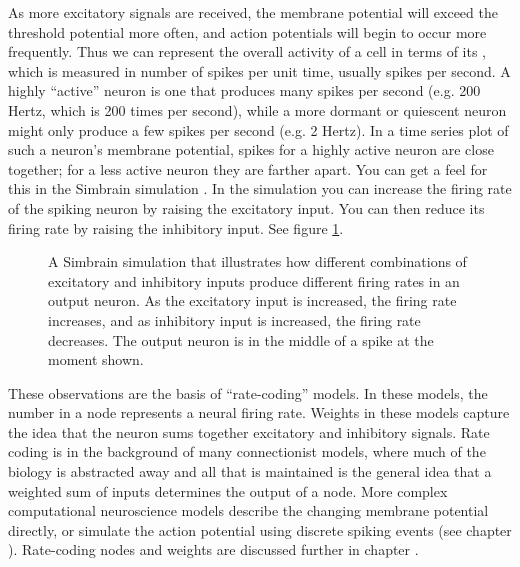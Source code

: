 As more excitatory signals are received, the membrane potential will exceed the threshold potential more often, and action potentials will begin to occur more frequently. Thus we can represent the overall activity of a cell in terms of its , which is measured in number of spikes per unit time, usually spikes per second. A highly ``active'' neuron is one that produces many spikes per second (e.g. 200 Hertz, which is 200 times per second), while a more dormant or quiescent neuron might only produce a few spikes per second (e.g. 2 Hertz). In a time series plot of such a neuron's membrane potential, spikes for a highly active neuron are close together; for a less active neuron they are farther apart. You can get a feel for this in the Simbrain simulation . In the simulation you can increase the firing rate of the spiking neuron by raising the excitatory input. You can then reduce its firing rate by raising the inhibitory input. See figure \ref{twoNeuronsSpiking}.
  
 \begin{figure}[h]
\centering
{}
\caption[Jeff Yoshimi.]{A Simbrain simulation that illustrates how different combinations of excitatory and inhibitory inputs produce different firing rates in an output neuron. As the excitatory input is increased, the firing rate increases, and as inhibitory input is increased, the firing rate decreases. The output neuron is in the middle of a spike at the moment shown. }
\label{twoNeuronsSpiking}
\end{figure}

These observations are the basis of ``rate-coding'' models. In these models, the number in a node represents a neural firing rate. Weights in these models capture the idea that the neuron sums together excitatory and inhibitory signals. Rate coding is in the background of many connectionist models, where much of the biology is abstracted away and all that is maintained is the general idea that a weighted sum of inputs determines the output of a node. More complex computational neuroscience models describe the changing membrane potential directly, or simulate the action potential using discrete spiking events (see chapter ). Rate-coding nodes and weights are discussed further in chapter .

